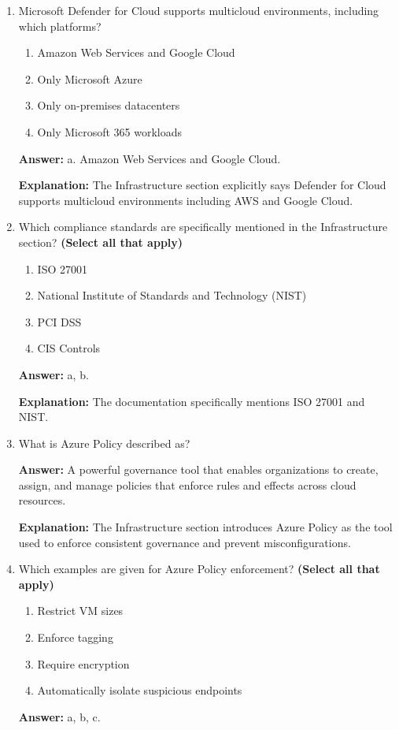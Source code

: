 \documentclass[10pt]{article}
\begin{document}
\begin{enumerate}[leftmargin=*]
\textbf{Explanation:} These are the exact services listed in the documentation.

\item Microsoft Defender for Cloud supports multicloud environments, including which platforms?
\begin{enumerate}[label=\alph*., leftmargin=1.5em]
\item Amazon Web Services and Google Cloud
\item Only Microsoft Azure
\item Only on-premises datacenters
\item Only Microsoft 365 workloads
\end{enumerate}
\textbf{Answer:} a. Amazon Web Services and Google Cloud.

\textbf{Explanation:} The Infrastructure section explicitly says Defender for Cloud supports multicloud environments including AWS and Google Cloud.

\item Which compliance standards are specifically mentioned in the Infrastructure section? \textbf{(Select all that apply)}
\begin{enumerate}[label=\alph*., leftmargin=1.5em]
\item ISO 27001
\item National Institute of Standards and Technology (NIST)
\item PCI DSS
\item CIS Controls
\end{enumerate}
\textbf{Answer:} a, b.

\textbf{Explanation:} The documentation specifically mentions ISO 27001 and NIST.

\item What is Azure Policy described as?

\textbf{Answer:} A powerful governance tool that enables organizations to create, assign, and manage policies that enforce rules and effects across cloud resources.

\textbf{Explanation:} The Infrastructure section introduces Azure Policy as the tool used to enforce consistent governance and prevent misconfigurations.

\item Which examples are given for Azure Policy enforcement? \textbf{(Select all that apply)}
\begin{enumerate}[label=\alph*., leftmargin=1.5em]
\item Restrict VM sizes
\item Enforce tagging
\item Require encryption
\item Automatically isolate suspicious endpoints
\end{enumerate}
\textbf{Answer:} a, b, c.


\end{enumerate}
\end{document}
